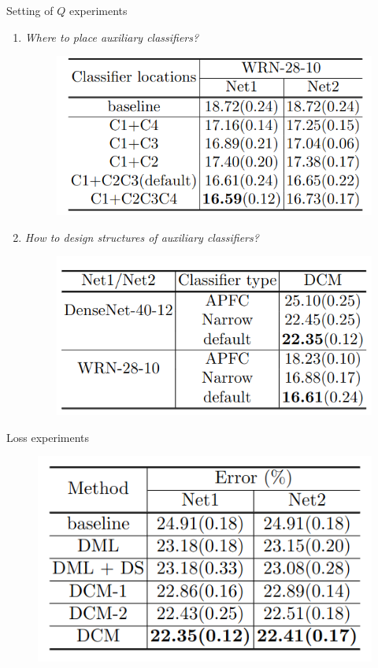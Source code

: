 \documentclass{beamer}
\begin{document}
\begin{frame}{Setting of $Q$ experiments}
    \begin{enumerate}
        \item \textit{Where to place auxiliary classifiers?}
            \begin{figure}[h]
                \includegraphics[scale=0.25]{images/table3.png}
            \end{figure}
        \item \textit{How to design structures of auxiliary classifiers?}
            \begin{figure}[h]
                \includegraphics[scale=0.25]{images/table4.png}
            \end{figure}
    \end{enumerate}
\end{frame}

\begin{frame}{Loss experiments}
    \begin{figure}[h]
        \includegraphics[scale=0.4]{images/table5.png}
    \end{figure}
\end{frame}
\end{document}
